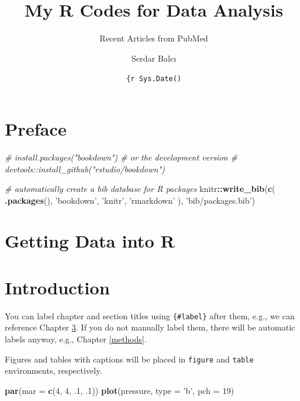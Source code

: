 \documentclass[
]{book}
\title{My R Codes for Data Analysis}
\subtitle{Recent Articles from PubMed}
\author{Serdar Balcı}
\date{\texttt{\{r\ Sys.Date()}}
\newenvironment{Shaded}{\begin{snugshade}}{\end{snugshade}}
\newcommand{\CommentTok}[1]{\textcolor[rgb]{0.56,0.35,0.01}{\textit{#1}}}
\newcommand{\DataTypeTok}[1]{\textcolor[rgb]{0.13,0.29,0.53}{#1}}
\newcommand{\DecValTok}[1]{\textcolor[rgb]{0.00,0.00,0.81}{#1}}
\newcommand{\FloatTok}[1]{\textcolor[rgb]{0.00,0.00,0.81}{#1}}
\newcommand{\KeywordTok}[1]{\textcolor[rgb]{0.13,0.29,0.53}{\textbf{#1}}}
\newcommand{\NormalTok}[1]{#1}
\newcommand{\OperatorTok}[1]{\textcolor[rgb]{0.81,0.36,0.00}{\textbf{#1}}}
\newcommand{\StringTok}[1]{\textcolor[rgb]{0.31,0.60,0.02}{#1}}
\begin{document}
\maketitle

{
\setcounter{tocdepth}{1}
\tableofcontents
}
\hypertarget{preface}{%
\chapter{Preface}\label{preface}}

\begin{Shaded}
\begin{Highlighting}[]
\CommentTok{# install.packages("bookdown")}
\CommentTok{# or the development version}
\CommentTok{# devtools::install_github("rstudio/bookdown")}
\end{Highlighting}
\end{Shaded}

\begin{Shaded}
\begin{Highlighting}[]
\CommentTok{# automatically create a bib database for R packages}
\NormalTok{knitr}\OperatorTok{::}\KeywordTok{write_bib}\NormalTok{(}\KeywordTok{c}\NormalTok{(}
  \KeywordTok{.packages}\NormalTok{(), }\StringTok{'bookdown'}\NormalTok{, }\StringTok{'knitr'}\NormalTok{, }\StringTok{'rmarkdown'}
\NormalTok{), }\StringTok{'bib/packages.bib'}\NormalTok{)}
\end{Highlighting}
\end{Shaded}

\hypertarget{getting-data-into-r}{%
\chapter{Getting Data into R}\label{getting-data-into-r}}

\hypertarget{intro}{%
\chapter{Introduction}\label{intro}}

You can label chapter and section titles using \texttt{\{\#label\}} after them, e.g., we can reference Chapter \ref{intro}. If you do not manually label them, there will be automatic labels anyway, e.g., Chapter \ref{methods}.

Figures and tables with captions will be placed in \texttt{figure} and \texttt{table} environments, respectively.

\begin{Shaded}
\begin{Highlighting}[]
\KeywordTok{par}\NormalTok{(}\DataTypeTok{mar =} \KeywordTok{c}\NormalTok{(}\DecValTok{4}\NormalTok{, }\DecValTok{4}\NormalTok{, }\FloatTok{.1}\NormalTok{, }\FloatTok{.1}\NormalTok{))}
\KeywordTok{plot}\NormalTok{(pressure, }\DataTypeTok{type =} \StringTok{'b'}\NormalTok{, }\DataTypeTok{pch =} \DecValTok{19}\NormalTok{)}
\end{Highlighting}
\end{Shaded}
\end{document}
